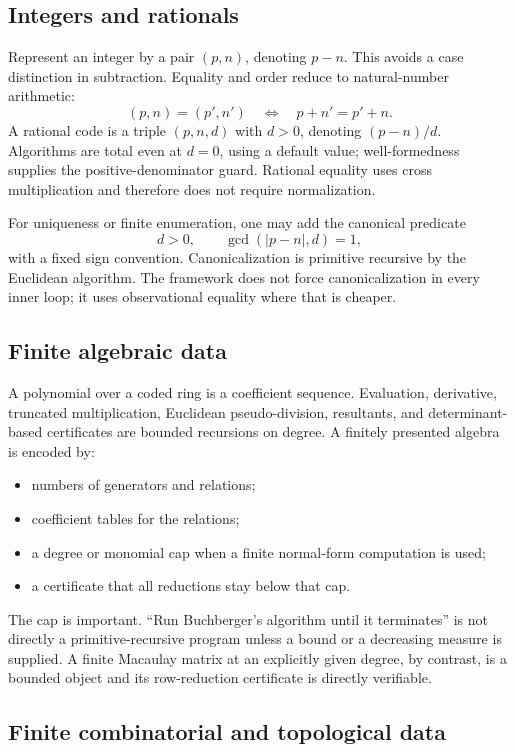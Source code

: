 \subsection{Integers and rationals}

Represent an integer by a pair \((p,n)\), denoting \(p-n\).  This avoids a
case distinction in subtraction.  Equality and order reduce to natural-number
arithmetic:
\[
  (p,n)=(p',n')\quad\Longleftrightarrow\quad p+n'=p'+n.
\]
A rational code is a triple \((p,n,d)\) with \(d>0\), denoting
\((p-n)/d\).  Algorithms are total even at \(d=0\), using a default value;
well-formedness supplies the positive-denominator guard.  Rational equality
uses cross multiplication and therefore does not require normalization.

For uniqueness or finite enumeration, one may add the canonical predicate
\[
  d>0,\qquad \gcd(|p-n|,d)=1,
\]
with a fixed sign convention.  Canonicalization is primitive recursive by the
Euclidean algorithm.  The framework does not force canonicalization in every
inner loop; it uses observational equality where that is cheaper.

\subsection{Finite algebraic data}

A polynomial over a coded ring is a coefficient sequence.  Evaluation,
derivative, truncated multiplication, Euclidean pseudo-division, resultants,
and determinant-based certificates are bounded recursions on degree.
A finitely presented algebra is encoded by:
\begin{itemize}
\item numbers of generators and relations;
\item coefficient tables for the relations;
\item a degree or monomial cap when a finite normal-form computation is used;
\item a certificate that all reductions stay below that cap.
\end{itemize}

The cap is important.  ``Run Buchberger's algorithm until it terminates'' is
not directly a primitive-recursive program unless a bound or a decreasing
measure is supplied.  A finite Macaulay matrix at an explicitly given degree,
by contrast, is a bounded object and its row-reduction certificate is directly
verifiable.

\subsection{Finite combinatorial and topological data}

